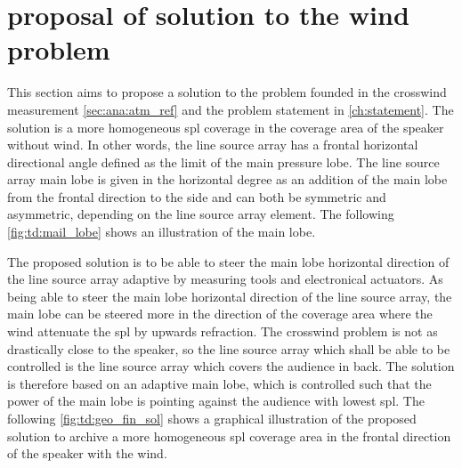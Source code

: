 \section{proposal of solution to the wind problem}\label{sec:td:pro_sol_pro}

This section aims to propose a solution to the problem founded in the crosswind measurement \autoref{sec:ana:atm_ref} and the problem statement in \autoref{ch:statement}. 
The solution is a more homogeneous \gls{spl} coverage in the coverage area of the speaker without wind. In other words, the line source array has a frontal horizontal directional angle defined as the  limit of the main pressure lobe. The line source array main lobe is given in the horizontal degree as an addition of the main lobe from the frontal direction to the side and can both be symmetric and asymmetric, depending on the line source array element. The following \autoref{fig:td:mail_lobe} shows an illustration of the main lobe. 


The proposed solution is to be able to steer the main lobe horizontal direction of the line source array adaptive by measuring tools and electronical actuators. 
As being able to steer the main lobe horizontal direction of the line source array, the main lobe can be steered more in the direction of the coverage area where the wind attenuate the \gls{spl} by upwards refraction.  The crosswind problem is not as drastically close to the speaker, so the line source array which shall be able to be controlled is the line source array which covers the audience in back. The solution is therefore based on an adaptive main lobe, which is controlled such that the power of the main lobe is pointing against the audience with lowest \gls{spl}. The following \autoref{fig:td:geo_fin_sol} shows a graphical illustration of the proposed solution to archive a more homogeneous \gls{spl} coverage area in the frontal direction of the speaker with the wind.


